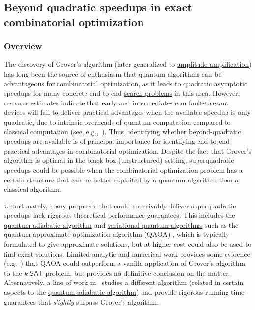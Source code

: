 \begin{refsection}
\subsection{Beyond quadratic speedups in exact combinatorial optimization}\label{appl:BeyondGrover}

\newcommand{\SAT}{\mathsf{SAT}}
\newcommand{\QUBO}{\mathsf{QUBO}}
\newcommand{\MAXCUT}{$\mathsf{MAX}$-$\mathsf{CUT}$}

\subsubsection*{Overview}

The discovery of Grover's algorithm \cite{grover1996QSearch} (later generalized to \hyperref[prim:AmpAmp]{amplitude amplification}) has long been the source of enthusiasm that quantum algorithms can be advantageous for combinatorial optimization, as it leads to quadratic asymptotic speedups for many concrete end-to-end \hyperref[appl:SearchAlgorithms]{search problems} in this area. However, resource estimates indicate that early and intermediate-term \hyperref[prim:FTQC]{fault-tolerant} devices will fail to deliver practical advantages when the available speedup is only quadratic, due to intrinsic  overheads of quantum computation compared to classical computation (see, e.g.,~\cite{campbell2019ApplyingQToCSPs,babbush2021FocusBeyondQuadratic}). Thus, identifying whether beyond-quadratic speedups are available is of principal importance for identifying end-to-end practical advantages in combinatorial optimization. Despite the fact that Grover's algorithm is optimal in the black-box (unstructured) setting, superquadratic speedups could be possible when the combinatorial optimization problem has a certain structure that can be better exploited by a quantum algorithm than a classical algorithm. 

Unfortunately, many proposals that could conceivably deliver superquadratic speedups lack rigorous theoretical performance guarantees. This includes the \hyperref[prim:QuantumAdiabaticAlgorithm]{quantum adiabatic algorithm} and \hyperref[prim:VQA]{variational quantum algorithms} such as the quantum approximate optimization algorithm (QAOA) \cite{farhi2014QAOA}, which is typically formulated to give approximate solutions, but at higher cost could also be used to find exact solutions. Limited analytic and numerical work provides some evidence (e.g.~\cite{boulebnane2022solvingSATwQAOA,shaydulin2023evidenceQAOA}) that QAOA could outperform a vanilla application of Grover's algorithm to the $k$-$\SAT$ problem, but provides no definitive conclusion on the matter. Alternatively, a line of work in~\cite{hastings2018ShortPathQuantum,dalzell2022mindthegap} studies a different algorithm (related in certain aspects to the \hyperref[prim:QuantumAdiabaticAlgorithm]{quantum adiabatic algorithm}) and provide rigorous running time guarantees that \emph{slightly} surpass Grover's algorithm. 


\end{refsection}
